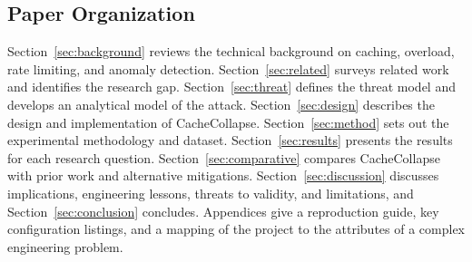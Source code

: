 \subsection{Paper Organization}
Section~\ref{sec:background} reviews the technical background on caching, overload,
rate limiting, and anomaly detection. Section~\ref{sec:related} surveys related work
and identifies the research gap. Section~\ref{sec:threat} defines the threat model and
develops an analytical model of the attack. Section~\ref{sec:design} describes the
design and implementation of CacheCollapse. Section~\ref{sec:method} sets out the
experimental methodology and dataset. Section~\ref{sec:results} presents the results
for each research question. Section~\ref{sec:comparative} compares CacheCollapse with
prior work and alternative mitigations. Section~\ref{sec:discussion} discusses
implications, engineering lessons, threats to validity, and limitations, and
Section~\ref{sec:conclusion} concludes. Appendices give a reproduction guide, key
configuration listings, and a mapping of the project to the attributes of a complex
engineering problem.

